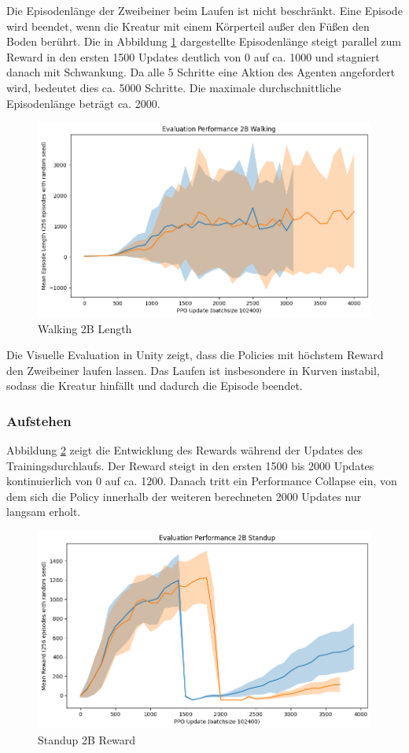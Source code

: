 Die Episodenlänge der Zweibeiner beim Laufen ist nicht beschränkt. Eine Episode wird beendet, wenn die Kreatur mit einem Körperteil außer den Füßen den Boden berührt. Die in Abbildung \ref{fig:Walking2B_Length} dargestellte Episodenlänge steigt parallel zum Reward in den ersten 1500 Updates deutlich von 0 auf ca. 1000 und stagniert danach mit Schwankung. Da alle 5 Schritte eine Aktion des Agenten angefordert wird, bedeutet dies ca. 5000 Schritte. Die maximale durchschnittliche Episodenlänge beträgt ca. 2000.

\begin{figure}[ht]
    \centering
    \includegraphics[width=0.5\linewidth]{resources/img/results/Walking2B_Length.png}
    \caption{Walking 2B Length}\label{fig:Walking2B_Length}
\end{figure}

Die Visuelle Evaluation in Unity zeigt, dass die Policies mit höchstem Reward den Zweibeiner laufen lassen. Das Laufen ist insbesondere in Kurven instabil, sodass die Kreatur hinfällt und dadurch die Episode beendet.

\subsubsection{Aufstehen}

Abbildung \ref{fig:Standup2B_Reward} zeigt die Entwicklung des Rewards während der Updates des Trainingsdurchlaufs. Der Reward steigt in den ersten 1500 bis 2000 Updates kontinuierlich von 0 auf ca. 1200. Danach tritt ein Performance Collapse ein, von dem sich die Policy innerhalb der weiteren berechneten 2000 Updates nur langsam erholt.

\begin{figure}[ht]
    \centering
    \includegraphics[width=0.5\linewidth]{resources/img/results/Standup2B_Reward.png}
    \caption{Standup 2B Reward}\label{fig:Standup2B_Reward}
\end{figure}

